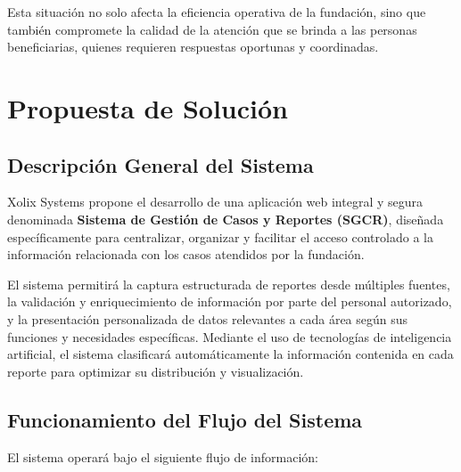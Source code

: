 \documentclass[12pt,letterpaper]{article}
\begin{document}
Esta situación no solo afecta la eficiencia operativa de la fundación, sino que también compromete la calidad de la atención que se brinda a las personas beneficiarias, quienes requieren respuestas oportunas y coordinadas.

\newpage

\section{Propuesta de Solución}

\subsection{Descripción General del Sistema}

Xolix Systems propone el desarrollo de una aplicación web integral y segura denominada \textbf{Sistema de Gestión de Casos y Reportes (SGCR)}, diseñada específicamente para centralizar, organizar y facilitar el acceso controlado a la información relacionada con los casos atendidos por la fundación.

El sistema permitirá la captura estructurada de reportes desde múltiples fuentes, la validación y enriquecimiento de información por parte del personal autorizado, y la presentación personalizada de datos relevantes a cada área según sus funciones y necesidades específicas. Mediante el uso de tecnologías de inteligencia artificial, el sistema clasificará automáticamente la información contenida en cada reporte para optimizar su distribución y visualización.

\subsection{Funcionamiento del Flujo del Sistema}

El sistema operará bajo el siguiente flujo de información:
\end{document}
